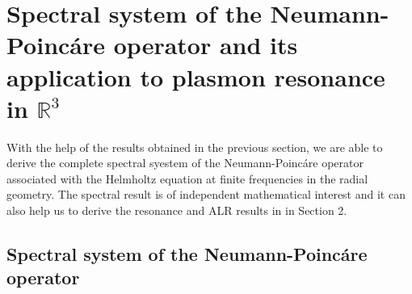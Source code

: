 \documentclass[11pt,reqno,twoside]{amsart}
\theoremstyle{definition}
\theoremstyle{remark}
\numberwithin{equation}{section}
\begin{document}
\section{Spectral system of the Neumann-Poinc\'are operator and its application to plasmon resonance in $\mathbb{R}^3$}

With the help of the results obtained in the previous section, we are able to derive the complete spectral syestem of the Neumann-Poinc\'are operator associated with the Helmholtz equation at finite frequencies in the radial geometry. The spectral result is of independent mathematical interest and it can also help us to derive the resonance and ALR results in in Section 2.

\subsection{Spectral system of the Neumann-Poinc\'are operator}
\end{document}
